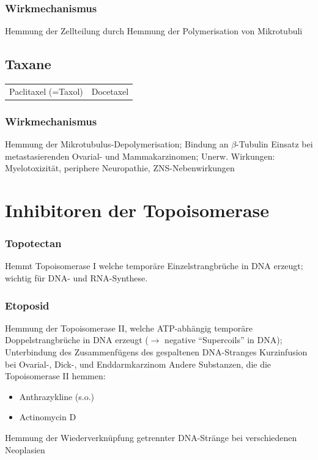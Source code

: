 \documentclass[10pt,a4paper]{report}
\begin{document}
\subsubsection{Wirkmechanismus} %
\label{par:wirkmechanismus}
Hemmung der Zellteilung durch Hemmung der Polymerisation von Mikrotubuli
\subsection{Taxane} %
\label{sub:taxane}
\begin{tabularx}{\textwidth}{XX}
Paclitaxel (=Taxol)&Docetaxel\\
\end{tabularx}
\subsubsection{Wirkmechanismus} %
\label{ssub:wirkmechanismus}
Hemmung der Mikrotubulus-Depolymerisation; Bindung an $\beta$-Tubulin
Einsatz bei metastasierenden Ovarial- und Mammakarzinomen; 
Unerw. Wirkungen: Myelotoxizität, periphere Neuropathie, ZNS-Nebenwirkungen

\section{Inhibitoren der Topoisomerase} %
\label{sec:inhibitoren_der_topoisomerase}
\subsubsection{Topotectan} %
\label{ssub:topotectan}
Hemmt Topoisomerase I welche temporäre Einzelstrangbrüche in DNA erzeugt; wichtig für DNA- und RNA-Synthese.
\subsubsection{Etoposid} %
\label{ssub:etoposid}
Hemmung der Topoisomerase II, welche ATP-abhängig temporäre Doppelstrangbrüche in DNA erzeugt  ($\rightarrow$ negative “Supercoils” in DNA); Unterbindung des Zusammenfügens des gespaltenen DNA-Stranges
Kurzinfusion bei Ovarial-, Dick-, und Enddarmkarzinom
Andere Substanzen, die die Topoisomerase II hemmen: 
\begin{itemize}
	\item Anthrazykline (s.o.)
	\item Actinomycin D
\end{itemize}
Hemmung der Wiederverknüpfung getrennter DNA-Stränge bei verschiedenen Neoplasien
\end{document}
